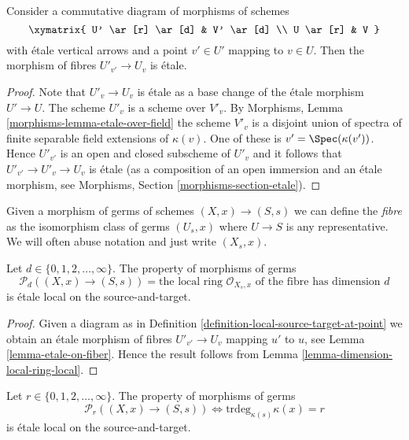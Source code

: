 \begin{lemma}
\label{lemma-etale-on-fiber}
Consider a commutative diagram of morphisms of schemes
$$
\xymatrix{
U' \ar[r] \ar[d] & V' \ar[d] \\
U \ar[r] & V
}
$$
with \'etale vertical arrows and a point $v' \in U'$ mapping to $v \in U$.
Then the morphism of fibres $U'_{v'} \to U_v$ is \'etale.
\end{lemma}

\begin{proof}
Note that $U'_v \to U_v$ is \'etale as a base change of the \'etale
morphism $U' \to U$. The scheme $U'_v$ is a scheme over $V'_v$. By
Morphisms, Lemma \ref{morphisms-lemma-etale-over-field}
the scheme $V'_v$ is a disjoint union of spectra
of finite separable field extensions of $\kappa(v)$.
One of these is $v' = \Spec(\kappa(v'))$. Hence
$U'_{v'}$ is an open and closed subscheme of $U'_v$ and it follows
that $U'_{v'} \to U'_v \to U_v$ is \'etale (as a composition of an
open immersion and an \'etale morphism, see
Morphisms, Section \ref{morphisms-section-etale}).
\end{proof}

\noindent
Given a morphism of germs of schemes $(X, x) \to (S, s)$
we can define the {\it fibre} as the isomorphism class of germs
$(U_s, x)$ where $U \to S$ is any representative. We will often abuse notation
and just write $(X_s, x)$.

\begin{lemma}
\label{lemma-dimension-local-ring-fibre}
Let $d \in \{0, 1, 2, \ldots, \infty\}$.
The property of morphisms of germs
$$
\mathcal{P}_d((X, x) \to (S, s)) =
\text{the local ring }
\mathcal{O}_{X_s, x}
\text{ of the fibre has dimension }d
$$
is \'etale local on the source-and-target.
\end{lemma}

\begin{proof}
Given a diagram as in
Definition \ref{definition-local-source-target-at-point}
we obtain an \'etale morphism of fibres
$U'_{v'} \to U_v$ mapping $u'$ to $u$, see
Lemma \ref{lemma-etale-on-fiber}.
Hence the result follows from
Lemma \ref{lemma-dimension-local-ring-local}.
\end{proof}

\begin{lemma}
\label{lemma-transcendence-degree-at-point}
Let $r \in \{0, 1, 2, \ldots, \infty\}$.
The property of morphisms of germs
$$
\mathcal{P}_r((X, x) \to (S, s))
\Leftrightarrow
\text{trdeg}_{\kappa(s)} \kappa(x) = r
$$
is \'etale local on the source-and-target.
\end{lemma}

